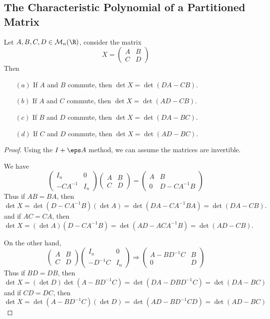 \subsection{The Characteristic Polynomial of a Partitioned Matrix}
\begin{lemma}
Let $A,B,C,D\in\mathcal{M}_n(\R)$, consider the matrix
\[X=\begin{pmatrix}
A&B\\
C&D
\end{pmatrix}\]
Then
\begin{itemize}
\item[$(a)$] If $A$ and $B$ commute, then $\det X=\det(DA-CB)$.
\item[$(b)$] If $A$ and $C$ commute, then $\det X=\det(AD-CB)$.
\item[$(c)$] If $B$ and $D$ commute, then $\det X=\det(DA-BC)$.
\item[$(d)$] If $C$ and $D$ commute, then $\det X=\det(AD-BC)$.
\end{itemize}
\end{lemma}
\begin{proof}
Using the $I+\eps A$ method, we can assume the matrices are invertible.\par
We have
\[\begin{pmatrix}
I_n&0\\
-CA^{-1}&I_n
\end{pmatrix}\begin{pmatrix}
A&B\\
C&D
\end{pmatrix}=\begin{pmatrix}
A&B\\
0&D-CA^{-1}B
\end{pmatrix}\]
Thus if $AB=BA$, then
\[\det X=\det(D-CA^{-1}B)(\det A)=\det(DA-CA^{-1}BA)=\det(DA-CB).\]
and if $AC=CA$, then
\[\det X=(\det A)(D-CA^{-1}B)=\det(AD-ACA^{-1}B)=\det(AD-CB).\]


On the other hand,
\[\begin{pmatrix}
A&B\\
C&D
\end{pmatrix}\begin{pmatrix}
I_n&0\\
-D^{-1}C&I_n
\end{pmatrix}\Longrightarrow\begin{pmatrix}
A-BD^{-1}C&B\\
0&D
\end{pmatrix}\]
Thus if $BD=DB$, then
\[\det X=(\det D)\det(A-BD^{-1}C)=\det(DA-DBD^{-1}C)=\det(DA-BC)\]
and if $CD=DC$, then
\[\det X=\det(A-BD^{-1}C)(\det D)=\det(AD-BD^{-1}CD)=\det(AD-BC)\]
\end{proof}
